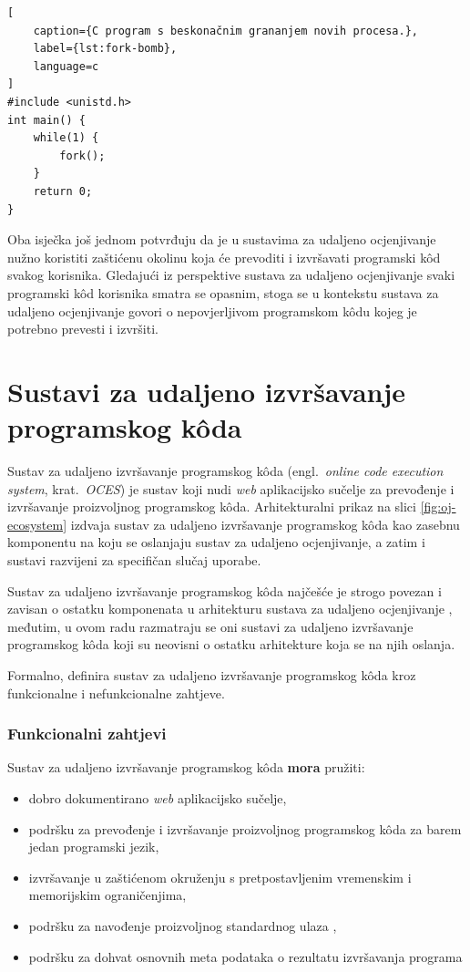 \documentclass[times, utf8, diplomski]{fer}
\begin{document}
\begin{lstlisting}[
    caption={C program s beskonačnim grananjem novih procesa.},
    label={lst:fork-bomb},
    language=c
]
#include <unistd.h>
int main() {
    while(1) {
        fork();
    }
    return 0;
}
\end{lstlisting}

Oba isječka još jednom potvrđuju da je u sustavima za udaljeno ocjenjivanje nužno koristiti zaštićenu okolinu koja će prevoditi i izvršavati programski kôd svakog korisnika. Gledajući iz perspektive sustava za udaljeno ocjenjivanje svaki programski kôd korisnika smatra se opasnim, stoga se u kontekstu sustava za udaljeno ocjenjivanje govori o nepovjerljivom programskom kôdu  kojeg je potrebno prevesti i izvršiti.

\section{Sustavi za udaljeno izvršavanje programskog kôda}
Sustav za udaljeno izvršavanje programskog kôda (engl.\ \textit{online code execution system}, krat.\ \textit{OCES}) je sustav koji nudi \textit{web} aplikacijsko sučelje  za prevođenje i izvršavanje proizvoljnog programskog kôda. Arhitekturalni prikaz na slici \ref{fig:oj-ecosystem} izdvaja sustav za udaljeno izvršavanje programskog kôda kao zasebnu komponentu na koju se oslanjaju sustav za udaljeno ocjenjivanje, a zatim i sustavi razvijeni za specifičan slučaj uporabe.

Sustav za udaljeno izvršavanje programskog kôda najčešće je strogo povezan i zavisan o ostatku komponenata u arhitekturu sustava za udaljeno ocjenjivanje \citep{9245310}, međutim, u ovom radu razmatraju se oni sustavi za udaljeno izvršavanje programskog kôda koji su neovisni o ostatku arhitekture koja se na njih oslanja.

Formalno, \citep{9245310} definira sustav za udaljeno izvršavanje programskog kôda kroz funkcionalne i nefunkcionalne zahtjeve.

\subsubsection{Funkcionalni zahtjevi}
Sustav za udaljeno izvršavanje programskog kôda \textbf{mora} pružiti:
\begin{itemize}
    \item dobro dokumentirano \textit{web} aplikacijsko sučelje,
    \item podršku za prevođenje i izvršavanje proizvoljnog programskog kôda za barem jedan programski jezik,
    \item izvršavanje u zaštićenom okruženju s pretpostavljenim vremenskim i memorijskim ograničenjima,
    \item podršku za navođenje proizvoljnog standardnog ulaza ,
    \item podršku za dohvat osnovnih meta podataka o rezultatu izvršavanja programa
\end{itemize}
\end{document}

